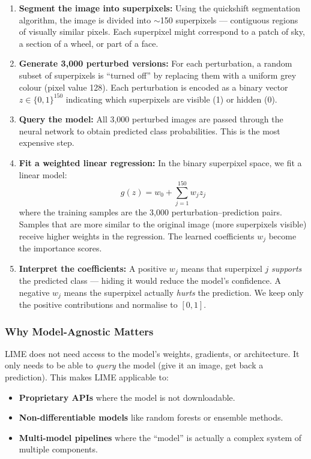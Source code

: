 \documentclass[12pt, a4paper]{article}
\begin{document}
\begin{enumerate}[leftmargin=*]
    \item \textbf{Segment the image into superpixels:}  Using the quickshift
          segmentation algorithm, the image is divided into $\sim$150
          superpixels --- contiguous regions of visually similar pixels.  Each
          superpixel might correspond to a patch of sky, a section of a
          wheel, or part of a face.

    \item \textbf{Generate 3{,}000 perturbed versions:}  For each perturbation,
          a random subset of superpixels is ``turned off'' by replacing them
          with a uniform grey colour (pixel value 128).  Each perturbation is
          encoded as a binary vector $z \in \{0, 1\}^{150}$ indicating which
          superpixels are visible (1) or hidden (0).

    \item \textbf{Query the model:}  All 3{,}000 perturbed images are passed
          through the neural network to obtain predicted class probabilities.
          This is the most expensive step.

    \item \textbf{Fit a weighted linear regression:}  In the binary
          superpixel space, we fit a linear model:
          \[
          g(z) = w_0 + \sum_{j=1}^{150} w_j z_j
          \]
          where the training samples are the 3{,}000 perturbation--prediction
          pairs.  Samples that are more similar to the original image (more
          superpixels visible) receive higher weights in the regression.  The
          learned coefficients $w_j$ become the importance scores.

    \item \textbf{Interpret the coefficients:}  A positive $w_j$ means that
          superpixel $j$ \emph{supports} the predicted class --- hiding it
          would reduce the model's confidence.  A negative $w_j$ means the
          superpixel actually \emph{hurts} the prediction.  We keep only the
          positive contributions and normalise to $[0, 1]$.
\end{enumerate}

\subsubsection{Why Model-Agnostic Matters}

LIME does not need access to the model's weights, gradients, or architecture.
It only needs to be able to \emph{query} the model (give it an image, get back
a prediction).  This makes LIME applicable to:
\begin{itemize}[leftmargin=*]
    \item \textbf{Proprietary APIs} where the model is not downloadable.
    \item \textbf{Non-differentiable models} like random forests or
          ensemble methods.
    \item \textbf{Multi-model pipelines} where the ``model'' is actually
          a complex system of multiple components.
\end{itemize}
\end{document}
